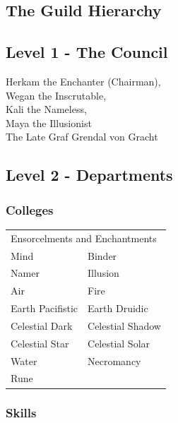 \documentclass[twoside,a4paper]{article}
\begin{document}
\begin{multicols}{2}
\raggedcolumns

\pagebreak

%
%

\section{The Guild Hierarchy}

\subsection{Level 1 - The Council}

\begin{flushleft}
Herkam the Enchanter (Chairman), \\
Wegan the Inscrutable, \\
Kali the Nameless, \\
Maya the Illusionist \\
The Late Graf Grendal von Gracht \\
\end{flushleft}

\subsection{Level 2 - Departments}

\subsubsection{Colleges}

\begin{tabular}{ll}
\multicolumn{2}{l}{Ensorcelments and Enchantments} \\
Mind			& Binder \\
Namer			& Illusion \\
Air			& Fire \\
Earth Pacifistic	&  Earth Druidic \\
Celestial Dark		&  Celestial Shadow \\
Celestial Star		&  Celestial Solar \\
Water			&  Necromancy \\
Rune			& \\
\end{tabular}

\subsubsection{Skills}


\end{multicols}
\end{document}
